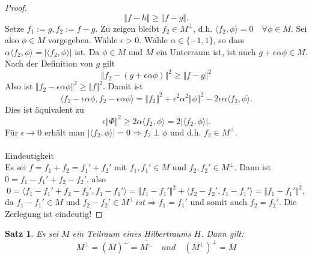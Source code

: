 \documentclass[12pt,titlepage]{article}
\newtheorem{satz}[zahl]{Satz}
\numberwithin{equation}{section}
\begin{document}
\begin{proof}
\[
\Vert f-h \Vert \geq \Vert f-g \Vert.
\]  
Setze $f_1 := g,f_2:= f-g$. Zu zeigen bleibt $f_2 \in M^{\perp}$,
 d.h. $\langle f_2, \phi\rangle=0 \quad \forall \phi \in M$. Sei also $\phi \in M$ vorgegeben.
 Wähle $\epsilon>0$. Wähle $\alpha\in \{-1,1\}$, so dass $\alpha \langle f_2,\phi\rangle=\vert \langle f_2,\phi\rangle\vert$ ist. Da $\phi \in M$ und $M$ ein Unterraum ist, ist auch $g+\epsilon \alpha \phi \in M.$ Nach der Definition von $g$ gilt 
 \[
\Vert f_2-(g+\epsilon \alpha \phi )\Vert^2\geq \Vert f-g\Vert^2 
 \]
 Also ist $\Vert f_2- \epsilon \alpha \phi\Vert^2\geq \Vert f\Vert^2$. Damit ist 
 \[
 \langle f_2-\epsilon \alpha \phi ,f_2-\epsilon \alpha \phi\rangle=\Vert f_2\Vert^2+\epsilon^2\alpha^2 \Vert \phi\Vert^2-2\epsilon \alpha \langle f_2,\phi \rangle.
 \]
 Dies ist äquivalent zu 
 \[
\epsilon\Vert \Phi \Vert^2 \geq 2 \alpha \langle f_2,\phi \rangle=2\vert \langle f_2,\phi\rangle\vert. 
 \]
 Für $\epsilon \rightarrow 0$ erhält man $\vert \langle f_2,\phi\rangle\vert=0 \Rightarrow f_2 \perp \phi $ und d.h. $f_2 \in M^{\perp}$.\\\\
 Eindeutigkeit\\
 Es sei $f=f_1+f_2=f_1'+f_2'$ mit $f_1,f_1'\in M$ und $f_2,f_2'\in M^{\perp}$. Dann ist $0=f_1-f_1'+f_2-f_2'$, also 
 \[
0=\langle f_1-f_1'+f_2-f_2',f_1-f_1' \rangle= \Vert  f_1-f_1'\Vert^2+ \langle f_2-f_2',f_1-f_1'\rangle=\Vert  f_1-f_1'\Vert^2,
 \]da $f_1-f_1'\in M$ und $f_2-f_2'\in M^{\perp} \,ist \Rightarrow f_1=f_1'$ und somit auch $f_2=f_2'$. Die Zerlegung ist eindeutig!
\end{proof}
\begin{satz}
Es sei $M$ ein Teilraum eines Hilbertraums $H$. Dann gilt:
\[
M^{\perp}=(\overline{M})^{\perp}=\overline{M^{\perp}}\quad und \quad {(M^{\perp})}^{\perp}=\overline{M}
\]
\end{satz}
\end{document}
